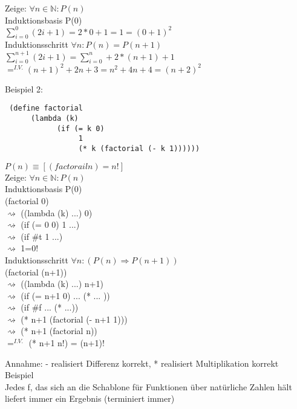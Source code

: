 \documentclass[paper=a4, fontsize=11pt]{scrartcl}
\numberwithin{equation}{section}
\numberwithin{figure}{section}
\numberwithin{table}{section}
\begin{document}
\begin{lstlistig}
 Zeige:  $\forall n \in \mathbb{N}: P(n)$ \\
 Induktionsbasis P(0) \\
 $\sum^{0}_{i=0}(2i+1)=2*0+1=1=(0+1)^{2}$ \\
 Induktionsschritt $\forall n: P(n) = P(n+1)$ \\
 $\sum^{n+1}_{i=0}(2i+1)=\sum^{n}_{i=0}+2*(n+1)+1$ \\
 $=^{I.V.} (n+1)^{2} +2n+3 = n^{2}+4n+4 = (n+2)^{2}$ \\
 
 \hfill \box
 
 Beispiel 2: \\
 \begin{lstlisting}
 (define factorial
      (lambda (k)
            (if (= k 0)
                 1
                 (* k (factorial (- k 1))))))
 \end{lstlisting}
 $P(n) \equiv [(factorail n) = n!]$ \\
 Zeige: $\forall n \in \mathbb{N}: P(n)$ \\
 Induktionsbasis P(0) \\
 (factorial 0) \\
 $\rightsquigarrow$ ((lambda (k) ...) 0) \\
 $\rightsquigarrow$ (if (= 0 0) 1 ...) \\
 $\rightsquigarrow$ (if \#t 1 ...) \\
 $\rightsquigarrow$ 1=0! \\
 Induktionsschritt $\forall n: (P(n) \Rightarrow P(n+1))$ \\
 (factorial (n+1)) \\
 $\rightsquigarrow$ ((lambda (k) ...) n+1) \\
 $\rightsquigarrow$ (if (= n+1 0) ... (* ... )) \\
 $\rightsquigarrow$ (if #f ... (* ...)) \\
 $\rightsquigarrow$ (* n+1 (factorial (- n+1 1))) \\
 $\rightsquigarrow$ (* n+1 (factorial n)) \\
 $=^{I.V.}$ (* n+1 n!) = (n+1)!
 
 \hfill \box
 
 Annahme: - realisiert Differenz korrekt, * realisiert Multiplikation korrekt \\
 
 Beispiel \\
 Jedes f, das sich an die Schablone für Funktionen über natürliche Zahlen hält liefert immer ein Ergebnis (terminiert immer) \\
 

\end{lstlistig}
\end{document}
